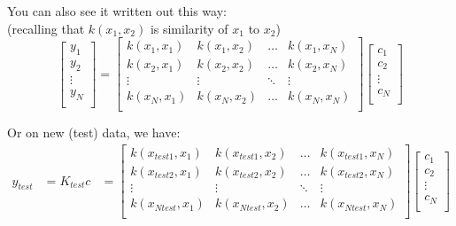 \documentclass{beamer}
\numberwithin{equation}{section}
\begin{document}
\begin{frame}
\small{You can also see it written out this way:} \\\footnotesize{(recalling that $k(x_1,x_2)$ is similarity of $x_1$ to $x_2$)}
\bigskip
\begin{equation*}
\left[
              \begin{array}{c}
                y_1 \\
                y_2 \\
                \vdots \\
                y_N \\
              \end{array}
            \right]= \left[
       \begin{array}{cccc}
         k(x_1,x_1) & k(x_1,x_2) & \ldots & k(x_1,x_N) \\
         k(x_2,x_1) & k(x_2,x_2)  &  \ldots & k(x_2,x_N) \\
         \vdots    & \vdots &  \ddots & \vdots \\
         k(x_N,x_1) & k(x_N,x_2) & \ldots & k(x_N,x_N) \\
       \end{array}
     \right]\left[
              \begin{array}{c}
                c_1 \\
                c_2 \\
                \vdots \\
                c_N \\
              \end{array}
            \right]
\end{equation*}

\pause
\small{Or on new (test) data, we have:}
\begin{align}
y_{test} &= K_{test} c
   &= \left[
       \begin{array}{cccc}
         k(x_{test1},x_1) & k(x_{test1},x_2) & \ldots & k(x_{test1},x_N) \\
         k(x_{test2},x_1) & k(x_{test2},x_2)  &  \ldots & k(x_{test2},x_N) \\
         \vdots    & \vdots &  \ddots & \vdots \\
         k(x_{Ntest},x_1) & k(x_{Ntest},x_2) & \ldots & k(x_{Ntest},x_N) \\
       \end{array}
      \right]\left[
              \begin{array}{c}
                c_1 \\
                c_2 \\
                \vdots \\
                c_N \\
              \end{array}
            \right]
\end{align}


\end{frame}
\end{document}
